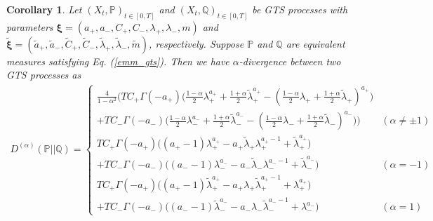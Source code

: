 \documentclass[preprint,11pt]{amsart}
\newtheorem{crl}{Corollary}
\begin{document}
	\begin{crl}
	\label{crl_div_gts}
		Let $(X_t, \mathbb{P})_{t\in[0,T]}$ and $(X_t, \mathbb{Q})_{t\in[0,T]}$ be GTS processes with parameters $\boldsymbol{\xi}=(a_+, a_-, C_+, C_-,\lambda_+,\lambda_-,m)$ and $\tilde{\boldsymbol{\xi}}=(\tilde{a}_+, \tilde{a}_-, \tilde{C}_+, \tilde{C}_-,\tilde{\lambda}_+,\tilde{\lambda}_-,\tilde{m})$, respectively. Suppose $\mathbb{P}$ and $\mathbb{Q}$ are equivalent measures satisfying Eq. (\ref{emm_gts}). Then we have $\alpha$-divergence between two GTS processes as
	\begin{align}
	\label{a_div_gts}
	D^{(\alpha )}(\mathbb{P}||\mathbb{Q})=\left\{ 
	\begin{array}{ll}
	\frac{4}{1-\alpha^2}\Big(TC_+\Gamma(-a_+)\big( \frac{1-\alpha}{2} \lambda_+^{a_+}+\frac{1+\alpha}{2} \tilde{\lambda}_+^{a_+}-( \frac{1-\alpha}{2} \lambda_++\frac{1+\alpha}{2} \tilde{\lambda}_+)^{a_+}\big)\\
	+TC_-\Gamma(-a_-)\big( \frac{1-\alpha}{2} \lambda_-^{a_-}+\frac{1+\alpha}{2} \tilde{\lambda}_-^{a_-}-( \frac{1-\alpha}{2} \lambda_-+\frac{1+\alpha}{2} \tilde{\lambda}_-)^{a_-}\big)\Big) & (\alpha \neq \pm 1)\\ 
	TC_+\Gamma(-a_+)\big((a_+-1)\lambda_+^{a_+}-a_+\tilde{\lambda}_+\lambda_+^{a_+-1}+\tilde{\lambda}_+^{a_+}\big)\\
	+TC_-\Gamma(-a_-)\big((a_--1)\lambda_-^{a_-}-a_-\tilde{\lambda}_-\lambda_-^{a_--1}+\tilde{\lambda}_-^{a_-}\big) & (\alpha =-1)\\
	TC_+\Gamma(-a_+)\big((a_+-1)\tilde{\lambda}_+^{a_+}-a_+\lambda_+\tilde{\lambda}_+^{a_+-1}+\lambda_+^{a_+}\big)\\
	+TC_-\Gamma(-a_-)\big((a_--1)\tilde{\lambda}_-^{a_-}-a_-\lambda_-\tilde{\lambda}_-^{a_--1}+\lambda_-^{a_-}\big) & (\alpha =1)
	\end{array}
	\right.
	\end{align}
	\end{crl}
\end{document}
